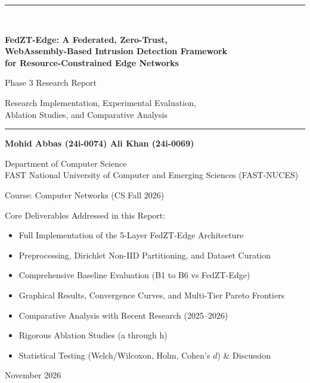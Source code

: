 \documentclass[11pt,a4paper]{article}
\begin{document}
\justifying

\thispagestyle{empty}
\begin{center}
\vspace*{1.6cm}
{\color{accent}\rule{\textwidth}{1.2pt}}\\[10pt]
{\LARGE\bfseries FedZT-Edge: A Federated, Zero-Trust,\\[4pt]
WebAssembly-Based Intrusion Detection Framework\\[4pt]
for Resource-Constrained Edge Networks\par}
\vspace{10pt}
{\Large Phase 3 Research Report\par}
\vspace{6pt}
{\large Research Implementation, Experimental Evaluation,\\[2pt]
Ablation Studies, and Comparative Analysis\par}
\vspace{10pt}
{\color{accent}\rule{\textwidth}{1.2pt}}
\vspace{1.5cm}

{\large\bfseries Mohid Abbas (24i-0074) \quad Ali Khan (24i-0069)\par}
\vspace{4pt}
{\normalsize Department of Computer Science\\
FAST National University of Computer and Emerging Sciences (FAST-NUCES)\par}
\vspace{4pt}
{\normalsize Course: Computer Networks (CS Fall 2026)\par}
\vspace{1.5cm}

{\normalsize Core Deliverables Addressed in this Report:\par}
\begin{itemize}[leftmargin=2.2em,itemsep=2pt]
  \item[\textbf{D1}] Full Implementation of the 5-Layer FedZT-Edge Architecture
  \item[\textbf{D2}] Preprocessing, Dirichlet Non-IID Partitioning, and Dataset Curation
  \item[\textbf{D3}] Comprehensive Baseline Evaluation (B1 to B6 vs FedZT-Edge)
  \item[\textbf{D4}] Graphical Results, Convergence Curves, and Multi-Tier Pareto Frontiers
  \item[\textbf{D5}] Comparative Analysis with Recent Research (2025--2026)
  \item[\textbf{D6}] Rigorous Ablation Studies (a through h)
  \item[\textbf{D7}] Statistical Testing (Welch/Wilcoxon, Holm, Cohen's $d$) \& Discussion
\end{itemize}
\vfill
{\normalsize November 2026\par}
\vspace{0.8cm}
\end{center}
\newpage
\end{document}
